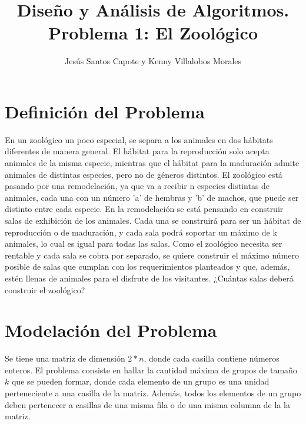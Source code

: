 \documentclass[article]{llncs}
\begin{document}
%
\title{Dise\~{n}o y An\'alisis de Algoritmos. Problema 1: El Zool\'ogico}
%
%
\author{Jes\'us Santos Capote y Kenny Villalobos Morales}
%
%
\maketitle              %
%
\section{Definici\'on del Problema}

En un zoológico un poco especial, se separa a los animales en dos 
hábitats diferentes de manera general. El hábitat para la reproducción 
solo acepta animales de la misma especie, mientras que el hábitat para 
la maduración admite animales de distintas especies, pero no de géneros 
distintos. El zoológico está pasando por una remodelación, ya que va 
a recibir n especies distintas de animales, cada una con un número 'a' 
de hembras y 'b' de machos, que puede ser distinto entre cada especie. 
En la remodelación se está pensando en construir salas de exhibición de 
los animales. Cada una se construirá para ser un hábitat de reproducción
 o de maduración, y cada sala podrá soportar un máximo de k animales, 
 lo cual es igual para todas las salas. Como el zoológico necesita ser 
 rentable y cada sala se cobra por separado, se quiere construir el 
 máximo número posible de salas que cumplan con los requerimientos 
 planteados y que, además, estén llenas de animales para el disfrute 
 de los visitantes. ¿Cuántas salas deberá construir el zoológico?

\section{Modelaci\'on del Problema}

Se tiene una matriz de dimensi\'on $2*n$, donde cada casilla contiene n\'umeros 
enteros. El problema consiste en hallar la cantidad m\'axima de grupos de 
tama\~{n}o $k$ que se pueden formar, donde cada elemento de un grupo es 
una unidad perteneciente a una casilla de la matriz. Adem\'as, todos los 
elementos de un grupo deben pertenecer a casillas de una misma fila o de 
una misma columna de la la matriz.
\end{document}
